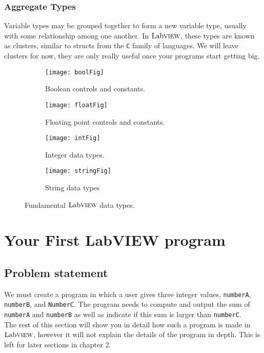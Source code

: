 	\subsubsection{Aggregate Types}
	Variable types may be grouped together to form a new variable type, usually with some relationship among one another. In $\text{Lab}\textsc{view}$, these types are known as clusters, similar to structs from the \texttt{C} family of languages. We will leave clusters for now, they are only really useful once your programs start getting big.
	\begin{figure}
		\centering
		\begin{subfigure}[b]{0.49\textwidth}
			\centering
			\texttt{[image: boolFig]}
			\caption{Boolean controls and constants.}
			\label{boolFig}
		\end{subfigure}
		\hfill
		\begin{subfigure}[b]{0.49\textwidth}
			\centering
			\texttt{[image: floatFig]}
			\caption{Floating point controls and constants.}
			\label{floatFig}
		\end{subfigure}
		\vfill
		\begin{subfigure}[b]{0.49\textwidth}
			\centering
			\texttt{[image: intFig]}
			\caption{Integer data types.}
			\label{intFig}
		\end{subfigure}
		\hfill
		\begin{subfigure}[b]{0.49\textwidth}
			\centering
			\texttt{[image: stringFig]}
			\caption{String data types}
			\label{stringFig}
		\end{subfigure}
		\caption{Fundamental $\text{Lab}\textsc{view}$ data types.}
		\label{DataTypes}
	\end{figure}

	\section{Your First LabVIEW program}
	\subsection{Problem statement}
	We must create a program in which a user gives three integer values, \texttt{numberA}, \texttt{numberB}, and \texttt{NumberC}. The program needs to compute and output the sum of \texttt{numberA} and \texttt{numberB} as well as indicate if this sum is larger than \texttt{numberC}.\\
	
	The rest of this section will show you in detail how such a program is made in $\text{Lab}\textsc{view}$, however it will not explain the details of the program in depth. This is left for later sections in chapter 2.\\%
